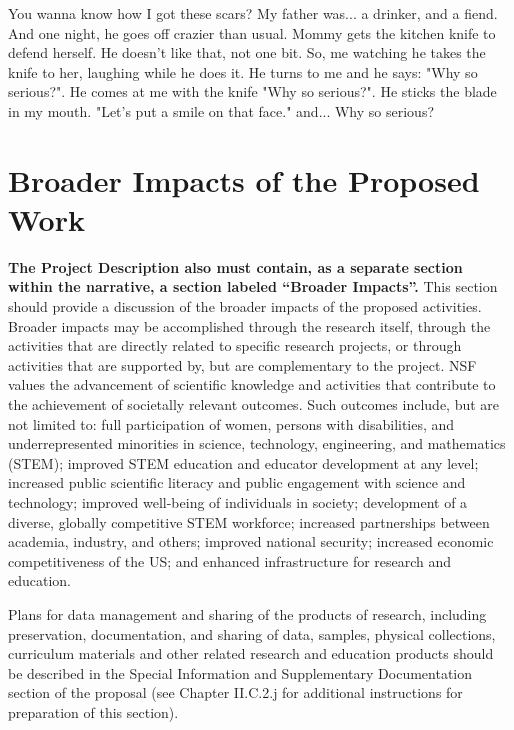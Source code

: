 You wanna know how I got these scars? My father was... a drinker, and a fiend. And one night, he goes off crazier than usual. Mommy gets the kitchen knife to defend herself. He doesn't like that, not one bit. So, me watching he takes the knife to her, laughing while he does it. He turns to me and he says: "Why so serious?". He comes at me with the knife "Why so serious?". He sticks the blade in my mouth. "Let's put a smile on that face." and... Why so serious?


\section{Broader Impacts of the Proposed Work}
\label{broadimpacts}
\vspace*{-8pt}

\begin{pappg}
    \textbf{The Project Description also must contain, as a separate section
    within the narrative, a section labeled ``Broader Impacts''.} This
    section should provide a discussion of the broader impacts of the
    proposed activities. Broader impacts may be accomplished through the
    research itself, through the activities that are directly related to
    specific research projects, or through activities that are supported by,
    but are complementary to the project. NSF values the advancement of
    scientific knowledge and activities that contribute to the achievement
    of societally relevant outcomes. Such outcomes include, but are not
    limited to: full participation of women, persons with disabilities, and
    underrepresented minorities in science, technology, engineering, and
    mathematics (STEM); improved STEM education and educator development at
    any level; increased public scientific literacy and public engagement
    with science and technology; improved well-being of individuals in
    society; development of a diverse, globally competitive STEM workforce;
    increased partnerships between academia, industry, and others; improved
    national security; increased economic competitiveness of the US; and
    enhanced infrastructure for research and education.

    Plans for data management and sharing of the products of research,
    including preservation, documentation, and sharing of data, samples,
    physical collections, curriculum materials and other related research
    and education products should be described in the Special Information
    and Supplementary Documentation section of the proposal (see Chapter
    II.C.2.j for additional instructions for preparation of this section).
\end{pappg}

